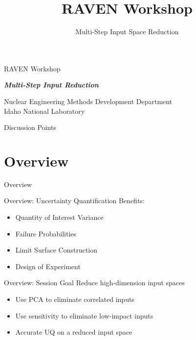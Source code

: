 \documentclass[t,9pt,svgnames]{beamer}
\makeatletter
\newcommand{\mytoc}{\@starttoc{toc}}
\makeatother
\begin{document}
\title[RAVEN Workshop]{RAVEN Workshop}
\subtitle{Multi-Step Input Space Reduction}

\begin{titleframe}{RAVEN Workshop}

{\bfseries\emph{Multi-Step Input Reduction}}

\vfill
{\small Nuclear Engineering Methods Development Department\\
Idaho National Laboratory}
\end{titleframe}

\begin{frame}{Discussion Points}
\mytoc
\end{frame}

\section{Overview}
\begin{frame}{Overview}
\end{frame}

\begin{frame}{Overview: Uncertainty Quantification}
  \vfill
  Benefits:
  \vfill
  \begin{itemize}
    \item Quantity of Interest Variance
  \vfill
    \item Failure Probabilities
  \vfill
    \item Limit Surface Construction
  \vfill
    \item Design of Experiment
  \end{itemize}
  \vfill
\end{frame}

\begin{frame}{Overview: Session Goal}
  \vfill
  Reduce high-dimension input spaces
  \vfill
  \begin{itemize}
    \item Use PCA to eliminate correlated inputs
  \vfill
    \item Use sensitivity to eliminate low-impact inputs
  \vfill
    \item Accurate UQ on a reduced input space
  \end{itemize}
  \vfill
\end{frame}
\end{document}
